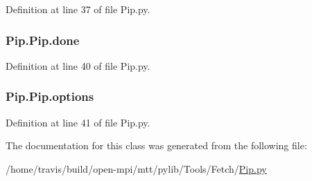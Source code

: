 Definition at line 37 of file Pip.\-py.

\hypertarget{class_pip_1_1_pip_adaa42730d39533e28bf8f74c8de40110}{
\subsubsection[{done}]{\setlength{\rightskip}{0pt plus 5cm}Pip.\-Pip.\-done}}\label{class_pip_1_1_pip_adaa42730d39533e28bf8f74c8de40110}


Definition at line 40 of file Pip.\-py.

\hypertarget{class_pip_1_1_pip_a81ef2ef6560b4befa1626bedb3fe96da}{
\subsubsection[{options}]{\setlength{\rightskip}{0pt plus 5cm}Pip.\-Pip.\-options}}\label{class_pip_1_1_pip_a81ef2ef6560b4befa1626bedb3fe96da}


Definition at line 41 of file Pip.\-py.



The documentation for this class was generated from the following file\-:\begin{DoxyCompactItemize}
\item 
/home/travis/build/open-\/mpi/mtt/pylib/\-Tools/\-Fetch/\hyperlink{_pip_8py}{Pip.\-py}\end{DoxyCompactItemize}
